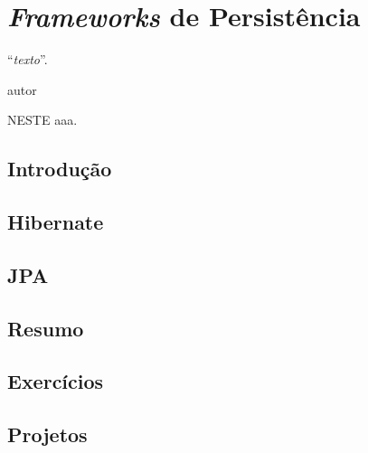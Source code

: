 \chapter{\textit{Frameworks} de Persistência}
\epigraph{``\textit{texto}''.}{autor}

\lettrine[lines=4, lhang=0.1, lraise=0, loversize=0.2, findent=0.1em]{\textcolor{corAzulTema}{N}}{ESTE} aaa.

\section{Introdução}

\section{Hibernate}

\section{JPA}

\section{Resumo}

\section{Exercícios}

\section{Projetos}
